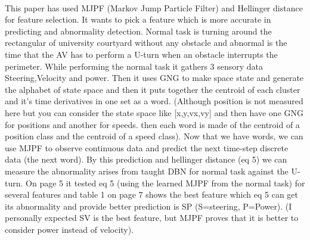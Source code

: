 \documentclass{article}
\begin{document}
			\paragraph{\cite{kanapram-2019-dynamic-bayesian-approach-for-decision-making-in-ego-things}}
			This paper has used MJPF (Markov Jump Particle Filter) and Hellinger distance for feature selection. It wants to pick a feature which is more accurate in predicting and abnormality detection. 
			Normal task is turning around the rectangular of university courtyard without any obstacle and abnormal is the time that the AV has to perform a U-turn when an obstacle interrupts the perimeter. While performing the normal task it gathers 3 sensory data Steering,Velocity and power. Then it uses GNG to make space state and generate the alphabet of state space and then it puts together the centroid of each cluster and it's time derivatives in one set as a word. (Although position is not measured here but you can consider the state space like [x,y,vx,vy] and then have one GNG for positions and another for speeds. then each word is made of the centroid of a position class and the centroid of a speed class). Now that we have words, we can use MJPF to observe continuous data and predict the next time-step discrete data (the next word). By this prediction and hellinger distance (eq 5) we can measure the abnormality arises from taught DBN for normal task against the U-turn. On page 5 it tested eq 5 (using the learned MJPF from the normal task) for several features and table 1 on page 7 shows the best feature which eq 5 can get its abnormality and provide better prediction is SP (S=steering, P=Power). (I personally expected SV is the best feature, but MJPF proves that it is better to consider power instead of velocity).  
			
\end{document}

